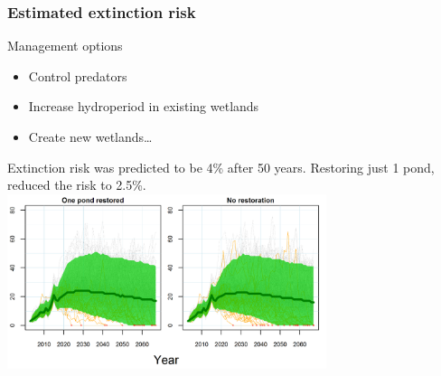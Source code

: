 \documentclass[color=usenames,dvipsnames]{beamer}
\begin{document}
\begin{frame}
  \frametitle{Estimated extinction risk}
   Management options %
        \begin{itemize}
          \item<1-> Control predators
          \item<1-> Increase hydroperiod in existing wetlands
          \item<1-> Create new wetlands\dots
        \end{itemize}
    \pause
    \vfill
    Extinction risk was predicted to be 4\% after 50
    years. Restoring just 1 pond, reduced the risk to 2.5\%.  \\
    \centering
    \includegraphics[width=0.7\textwidth]{figs/lich-forecasts}
\end{frame}



\end{document}
